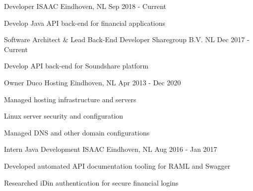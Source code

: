 \vspace{2mm}

\begin{cventries}
\cventry
  {Developer}
  {ISAAC}
  {Eindhoven, NL}
  {Sep 2018 - Current}
  {
    \begin{cvitems}
      \item {Develop Java API back-end for financial applications}
    \end{cvitems}
  }
  \vspace{4mm}

\cventry
  {Software Architect \& Lead Back-End Developer} %
  {Sharegroup B.V.} %
  {NL} %
  {Dec 2017 - Current} %
  {
    \begin{cvitems} %
      \item {Develop API back-end for Soundshare platform}
    \end{cvitems}
  }
  \vspace{4mm}
  
\cventry
  {Owner} %
  {Duco Hosting} %
  {Eindhoven, NL} %
  {Apr 2013 - Dec 2020} %
  {
    \begin{cvitems} %
      \item {Managed hosting infrastructure and servers}
      \item {Linux server security and configuration}
      \item {Managed DNS and other domain configurations}
    \end{cvitems}
  }
  \vspace{4mm}

  \cventry
    {Intern Java Development} %
    {ISAAC} %
    {Eindhoven, NL} %
    {Aug 2016 - Jan 2017} %
    {
      \begin{cvitems} %
        \item {Developed automated API documentation tooling for RAML and Swagger}
        \item {Researched iDin authentication for secure financial logins}
      \end{cvitems}
    }
    \vspace{4mm}


\end{cventries}
